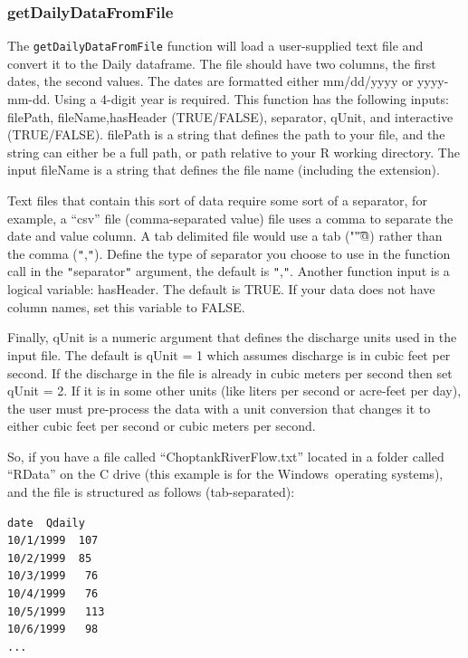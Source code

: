 \documentclass[a4paper,11pt]{article}\usepackage[]{graphicx}\usepackage[]{color}
\begin{document}
\subsubsection{getDailyDataFromFile}
\label{sec:DailyFile}
The \texttt{getDailyDataFromFile} function will load a user-supplied text file and convert it to the Daily dataframe. The file should have two columns, the first dates, the second values.  The dates are formatted either mm/dd/yyyy or yyyy-mm-dd. Using a 4-digit year is required. This function has the following inputs: filePath, fileName,hasHeader (TRUE/FALSE), separator, qUnit, and interactive (TRUE/FALSE). filePath is a string that defines the path to your file, and the string can either be a full path, or path relative to your R working directory. The input fileName is a string that defines the file name (including the extension).

Text files that contain this sort of data require some sort of a separator, for example, a \enquote{csv} file (comma-separated value) file uses a comma to separate the date and value column. A tab delimited file would use a tab (\verb@"\t"@) rather than the comma (\texttt{"},\texttt{"}). Define the type of separator you choose to use in the function call in the \texttt{"}separator\texttt{"} argument, the default is \texttt{"},\texttt{"}. Another function input is a logical variable: hasHeader.  The default is TRUE. If your data does not have column names, set this variable to FALSE.

Finally, qUnit is a numeric argument that defines the discharge units used in the input file.  The default is qUnit = 1 which assumes discharge is in cubic feet per second.  If the discharge in the file is already in cubic meters per second then set qUnit = 2.  If it is in some other units (like liters per second or acre-feet per day), the user must pre-process the data with a unit conversion that changes it to either cubic feet per second or cubic meters per second.

So, if you have a file called \enquote{ChoptankRiverFlow.txt} located in a folder called \enquote{RData} on the C drive (this example is for the Windows\textregistered\ operating systems), and the file is structured as follows (tab-separated):


\singlespacing
\begin{verbatim}
date  Qdaily
10/1/1999  107
10/2/1999  85
10/3/1999	76
10/4/1999	76
10/5/1999	113
10/6/1999	98
...
\end{verbatim}
\doublespacing
\end{document}

